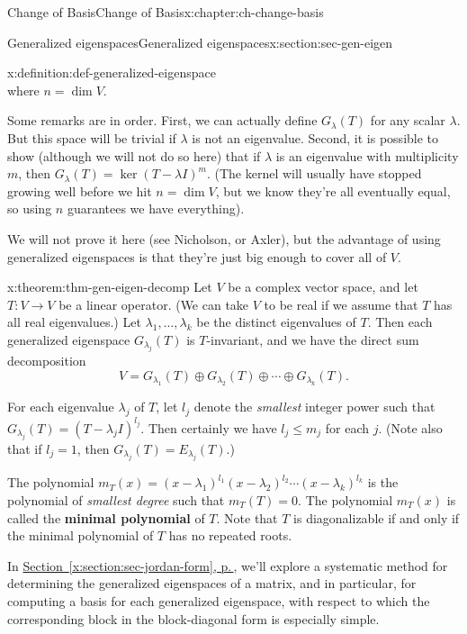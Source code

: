 \documentclass[oneside,10pt,]{book}
\newcommand{\xreffont}{\relax}
\newcommand{\terminology}[1]{\textbf{#1}}
\numberwithin{equation}{section}
\begin{document}
\begin{chapterptx}{Change of Basis}{}{Change of Basis}{}{}{x:chapter:ch-change-basis}
\begin{sectionptx}{Generalized eigenspaces}{}{Generalized eigenspaces}{}{}{x:section:sec-gen-eigen}
\begin{definition}{}{x:definition:def-generalized-eigenspace}
\begin{equation*}
\end{equation*}
where \(n=\dim V\).%
\end{definition}
Some remarks are in order. First, we can actually define \(G_\lambda(T)\) for any scalar \(\lambda\). But this space will be trivial if \(\lambda\) is not an eigenvalue. Second, it is possible to show (although we will not do so here) that if \(\lambda\) is an eigenvalue with multiplicity \(m\), then \(G_\lambda(T)=\ker (T-\lambda I)^m\). (The kernel will usually have stopped growing well before we hit \(n=\dim V\), but we know they're all eventually equal, so using \(n\) guarantees we have everything).%
\par
We will not prove it here (see Nicholson, or Axler), but the advantage of using generalized eigenspaces is that they're just big enough to cover all of \(V\).%
\begin{theorem}{}{}{x:theorem:thm-gen-eigen-decomp}%
Let \(V\) be a complex vector space, and let \(T:V\to V\) be a linear operator. (We can take \(V\) to be real if we assume that \(T\) has all real eigenvalues.) Let \(\lambda_1,\ldots, \lambda_k\) be the distinct eigenvalues of \(T\). Then each generalized eigenspace \(G_{\lambda_j}(T)\) is \(T\)-invariant, and we have the direct sum decomposition%
\begin{equation*}
V = G_{\lambda_1}(T)\oplus G_{\lambda_2}(T)\oplus \cdots \oplus G_{\lambda_k}(T)\text{.}
\end{equation*}
%
\end{theorem}
For each eigenvalue \(\lambda_j\) of \(T\), let \(l_j\) denote the \emph{smallest} integer power such that \(G_{\lambda_j}(T) = (T-\lambda_j I)^{l_j}\). Then certainly we have \(l_j\leq m_j\) for each \(j\). (Note also that if \(l_j=1\), then \(G_{\lambda_j}(T)=E_{\lambda_j}(T)\).)%
\par
The polynomial \(m_T(x) = (x-\lambda_1)^{l_1}(x-\lambda_2)^{l_2}\cdots (x-\lambda_k)^{l_k}\) is the polynomial of \emph{smallest degree} such that \(m_T(T)=0\). The polynomial \(m_T(x)\) is called the \terminology{minimal polynomial} of \(T\). Note that \(T\) is diagonalizable if and only if the minimal polynomial of \(T\) has no repeated roots.%
\par
In \hyperref[x:section:sec-jordan-form]{Section~{\xreffont\ref{x:section:sec-jordan-form}}, p.\,\pageref{x:section:sec-jordan-form}}, we'll explore a systematic method for determining the generalized eigenspaces of a matrix, and in particular, for computing a basis for each generalized eigenspace, with respect to which the corresponding block in the block-diagonal form is especially simple.%

\end{sectionptx}
\end{chapterptx}
\end{document}

